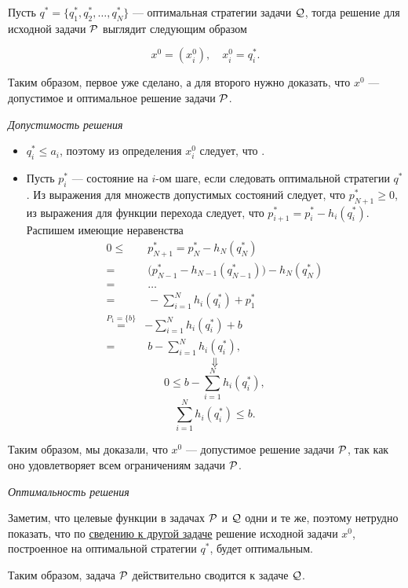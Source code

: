 Пусть $q^* = \{q_1^*, q_2^*, \dots, q_N^*\}$ --- оптимальная стратегии задачи $\Q$, тогда решение для исходной задачи $\P$ выглядит следующим образом

\[
x^0 = (x_i^0), \quad x_i^0 = q_i^*.
\]

Таким образом, первое уже сделано, а для второго нужно доказать, что $x^0$ --- допустимое и оптимальное решение задачи $\P$.

\bigskip

\textit{Допустимость решения}

\begin{itemize}[nosep]
	\item $q_i^* \le a_i$, поэтому из определения $x_i^0$ следует, что .
		
	\item Пусть $p_i^*$ --- состояние на $i$-ом шаге, если следовать оптимальной стратегии $q^*$.  Из выражения для множеств допустимых состояний следует, что $p_{N+1}^* \ge 0$, из выражения для функции перехода следует, что $p_{i+1}^* = p_i^* - h_i (q_i^*)$. Распишем имеющие неравенства
	\begin{align*}
		0 \le& \; p_{N+1}^* = p_N^* - h_N (q_N^*) \\
		=& \; \big(p_{N-1}^* - h_{N-1}(q_{N-1}^*)\big) - h_N (q_N^*) \\
		=& \; \dots \\
		=& \; -\sum_{i=1}^N h_i(q_i^*) + p_1^* \\
		\stackrel{P_1=\{b\}}{=}& -\sum_{i=1}^N h_i(q_i^*) + b \\
		=& \; b - \sum_{i=1}^N h_i(q_i^*),
	\end{align*}
	\[
	\Downarrow
	\]
	\[0 \le b - \sum_{i=1}^N h_i(q_i^*),\]
	\[\boxed{\sum_{i=1}^N h_i(q_i^*) \le b}.\]
\end{itemize}

Таким образом, мы доказали, что $x^0$ --- допустимое решение задачи $\P$, так как оно удовлетворяет всем ограничениям задачи $\P$.

\bigskip

\textit{Оптимальность решения}

Заметим, что целевые функции в задачах $\P$ и $\Q$ одни и те же, поэтому нетрудно показать, что по \hyperref[fact:reduction_to_other_problem]{сведению к другой задаче} решение исходной задачи $x^0$, построенное на оптимальной стратегии $q^*$, будет оптимальным.

Таким образом, задача $\P$ действительно сводится к задаче $\Q$.

